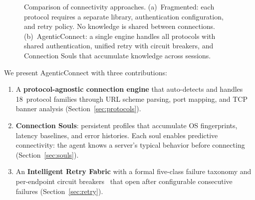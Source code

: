 \documentclass[10pt, twocolumn]{article}
\begin{document}
\begin{figure}[t]
\caption{Comparison of connectivity approaches. (a)~Fragmented: each protocol requires a separate library, authentication configuration, and retry policy. No knowledge is shared between connections. (b)~AgenticConnect: a single engine handles all protocols with shared authentication, unified retry with circuit breakers, and Connection Souls that accumulate knowledge across sessions.}
\label{fig:comparison}
\end{figure}

We present AgenticConnect with three contributions:

\begin{enumerate}[leftmargin=*, topsep=3pt, itemsep=1pt]
\item A \textbf{protocol-agnostic connection engine} that auto-detects and handles 18~protocol families through URL scheme parsing, port mapping, and TCP banner analysis (Section~\ref{sec:protocols}).
\item \textbf{Connection Souls}: persistent profiles that accumulate OS fingerprints, latency baselines, and error histories. Each soul enables predictive connectivity: the agent knows a server's typical behavior before connecting (Section~\ref{sec:souls}).
\item An \textbf{Intelligent Retry Fabric} with a formal five-class failure taxonomy and per-endpoint circuit breakers~\cite{nygard2018release} that open after configurable consecutive failures (Section~\ref{sec:retry}).
\end{enumerate}
\end{document}
